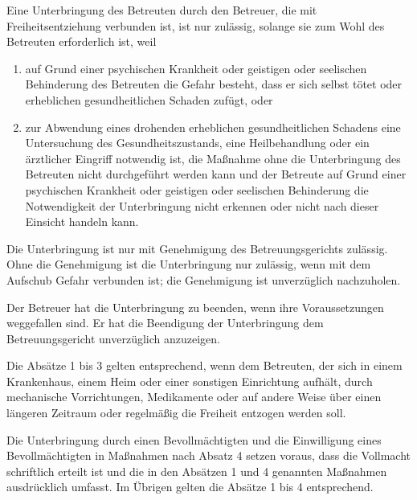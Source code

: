 \documentclass[pdftex,12pt,a4paper]{article}
\begin{document}
\begin{legal}

\item  Eine Unterbringung des Betreuten durch den Betreuer, die mit Freiheitsentziehung verbunden ist, ist nur zulässig, solange sie zum Wohl des Betreuten erforderlich ist, weil

\begin{enumerate}
\item auf Grund einer psychischen Krankheit oder geistigen oder seelischen Behinderung des Betreuten die Gefahr besteht, dass er sich selbst tötet oder erheblichen gesundheitlichen Schaden zufügt, oder

\item zur Abwendung eines drohenden erheblichen gesundheitlichen Schadens eine Untersuchung des Gesundheitszustands, eine Heilbehandlung oder ein ärztlicher Eingriff notwendig ist, die Maßnahme ohne die Unterbringung des Betreuten nicht durchgeführt werden kann und der Betreute auf Grund einer psychischen Krankheit oder geistigen oder seelischen Behinderung die Notwendigkeit der Unterbringung nicht erkennen oder nicht nach dieser Einsicht handeln kann.

\end{enumerate}

\item Die Unterbringung ist nur mit Genehmigung des Betreuungsgerichts zulässig. Ohne die Genehmigung ist die Unterbringung nur zulässig, wenn mit dem Aufschub Gefahr verbunden ist; die Genehmigung ist unverzüglich nachzuholen.

\item Der Betreuer hat die Unterbringung zu beenden, wenn ihre Voraussetzungen weggefallen sind. Er hat die Beendigung der Unterbringung dem Betreuungsgericht unverzüglich anzuzeigen.

\item Die Absätze 1 bis 3 gelten entsprechend, wenn dem Betreuten, der sich in einem Krankenhaus, einem Heim oder einer sonstigen Einrichtung aufhält, durch mechanische Vorrichtungen, Medikamente oder auf andere Weise über einen längeren Zeitraum oder regelmäßig die Freiheit entzogen werden soll.

\item Die Unterbringung durch einen Bevollmächtigten und die Einwilligung eines Bevollmächtigten in Maßnahmen nach Absatz 4 setzen voraus, dass die Vollmacht schriftlich erteilt ist und die in den Absätzen 1 und 4 genannten Maßnahmen ausdrücklich umfasst. Im Übrigen gelten die Absätze 1 bis 4 entsprechend.

\end{legal}
\end{document}
